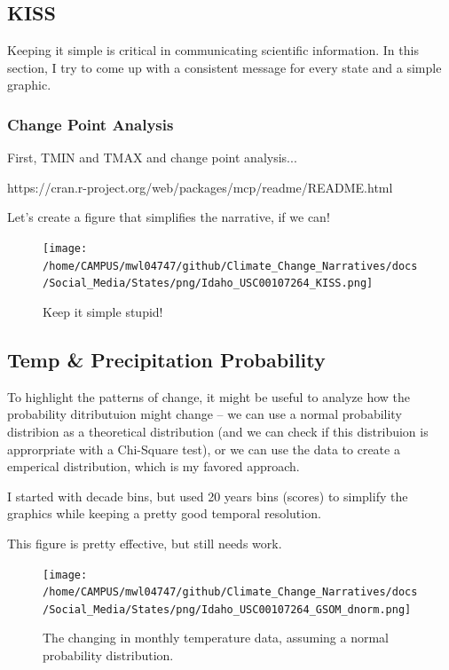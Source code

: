 \documentclass{article}\usepackage[]{graphicx}\usepackage[]{color}
\begin{document}
\subsection{KISS}

Keeping it simple is critical in communicating scientific information. In this section, I try to come up with a consistent message for every state and a simple graphic. 

\subsubsection{Change Point Analysis}
First, TMIN and TMAX and change point analysis...

https://cran.r-project.org/web/packages/mcp/readme/README.html



Let's create a figure that simplifies the narrative, if we can!



\begin{figure}
\texttt{[image: /home/CAMPUS/mwl04747/github/Climate\_Change\_Narratives/docs/Social\_Media/States/png/Idaho\_USC00107264\_KISS.png]}
\caption{Keep it simple stupid!}
\label{fig:GSOM-KISS}
\end{figure}

\subsection{Temp \& Precipitation Probability}

To highlight the patterns of change, it might be useful to analyze how the probability ditributuion might change -- we can use a normal probability distribion as a theoretical distribution (and we can check if this distribuion is approrpriate with a Chi-Square test), or we can use the data to create a emperical distribution, which is my favored approach. 

I started with decade bins, but used 20 years bins (scores) to simplify the graphics while keeping a pretty good temporal resolution.



This figure is pretty effective, but still needs work. 

\begin{figure}
\texttt{[image: /home/CAMPUS/mwl04747/github/Climate\_Change\_Narratives/docs/Social\_Media/States/png/Idaho\_USC00107264\_GSOM\_dnorm.png]}
\caption{The changing in monthly temperature data, assuming a normal probability distribution.}
\label{fig:GSOM_dnorm}
\end{figure}
\end{document}

